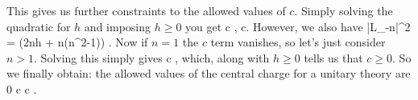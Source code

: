 This gives us further constraints to the allowed values of $c$. Simply solving the quadratic for $h$ and imposing $h\geq 0$ you get 
\bse 
     c , \qquad {} \qquad c.
\ese
However, we also have 
\bse 
    |L_{-n}\ket{\phi}|^2 = \bigg(2nh + n(n^2-1)\bigg) \braket{\phi}{\phi} .
\ese
Now if $n=1$ the $c$ term vanishes, so let's just consider $n>1$. Solving this simply gives 
\bse 
    c \geq {},
\ese 
which, along with $h\geq0$ tells us that $c\geq0$. So we finally obtain: the allowed values of the central charge for a unitary theory are
\be 
\label{eqn:cValuesUnitary}
    0 \leq c  \qquad {} \qquad c .
\ee 